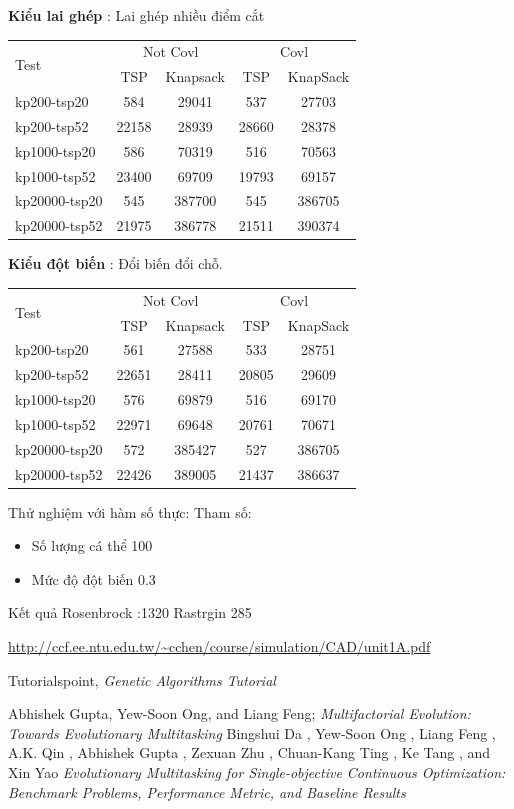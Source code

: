 \documentclass[a4paper,12pt]{report}
\begin{document}
\textbf{Kiểu lai ghép} : Lai ghép nhiều điểm cắt

\begin{longtable}{|l |c |c |c |c|}
\hline
\multirow{2}{*}{Test} 
& \multicolumn{2}{c|}{Not Covl} &\multicolumn{2}{|c|}{Covl} \\
\cline{2-5}
&TSP & Knapsack & TSP & KnapSack \\
\hline
kp200-tsp20  & 584&29041 &537 &27703 
\\ \hline
kp200-tsp52&22158 &28939&28660 &28378 \\ \hline
kp1000-tsp20 &586&70319&516&70563 \\ \hline
kp1000-tsp52 &23400&69709&19793&69157 \\ \hline
kp20000-tsp20 &545&387700&545 &386705 \\ \hline
kp20000-tsp52 &21975&386778&21511& 390374\\ \hline
\end{longtable}
\textbf{Kiểu đột biến} : Đổi biến đổi chỗ.

\begin{longtable}{|l |c |c |c |c|}
\hline
\multirow{2}{*}{Test} 
& \multicolumn{2}{c|}{Not Covl} &\multicolumn{2}{|c|}{Covl} \\
\cline{2-5}
&TSP & Knapsack & TSP & KnapSack \\
\hline
kp200-tsp20  & 561&27588 &533 &28751 
\\ \hline
kp200-tsp52&22651 &28411&20805 &29609 \\ \hline
kp1000-tsp20 &576&69879&516&69170 \\ \hline
kp1000-tsp52 &22971&69648&20761&70671 \\ \hline
kp20000-tsp20 &572&385427&527 &386705 \\ \hline

kp20000-tsp52 &22426 & 389005 & 21437 & 386637\\
\hline
\end{longtable}

Thử nghiệm với hàm số thực:
Tham số:

\begin{itemize}
\item Số lượng cá thể 100
\item Mức độ đột biến 0.3
\end{itemize}

Kết quả Rosenbrock :1320  Rastrgin 285
\begin{thebibliography}{9}
 \url{http://ccf.ee.ntu.edu.tw/~cchen/course/simulation/CAD/unit1A.pdf}

 Tutorialspoint, \textit{Genetic Algorithms Tutorial}

 Abhishek Gupta, Yew-Soon Ong, and Liang Feng; \textit{Multifactorial Evolution: Towards Evolutionary Multitasking}
Bingshui Da
, Yew-Soon Ong
, Liang Feng
, A.K. Qin
, Abhishek Gupta
,
Zexuan Zhu
, Chuan-Kang Ting
, Ke Tang
, and Xin Yao \textit{Evolutionary Multitasking for Single-objective
Continuous Optimization: Benchmark Problems,
Performance Metric, and Baseline Results
}
\end{thebibliography}
\end{document}
